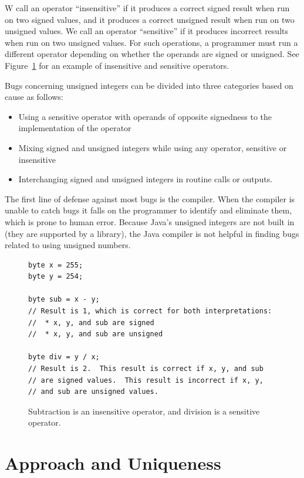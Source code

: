\documentclass{sig-alternate-05-2015}
\begin{document}
W call an operator ``insensitive'' if it produces a correct signed result
when run on two signed values, and it produces a correct unsigned result
when run on two unsigned values.  We call an operator ``sensitive'' if it
produces incorrect results when run on two unsigned values.  For such
operations, a programmer must run a different operator depending on whether
the operands are signed or unsigned.  See Figure~\ref{fig:operators} for
an example of insensitive and sensitive operators.

Bugs concerning unsigned integers can be divided into three categories based on cause as follows:

\begin{itemize}
  \item Using a sensitive operator with operands of opposite signedness to the implementation of the operator
  \item Mixing signed and unsigned integers while using any operator, sensitive or insensitive
  \item Interchanging signed and unsigned integers in routine calls or outputs.
\end{itemize}

The first line of defense against most bugs is the compiler. When the
compiler is unable to catch bugs it falls on the programmer to identify and
eliminate them, which is prone to human error. Because Java's unsigned
integers are not built in (they are supported by a library), the Java
compiler is not helpful in finding bugs related to using unsigned
numbers.

\begin{figure}
\smaller
\begin{lstlisting}
byte x = 255;
byte y = 254;

byte sub = x - y;
// Result is 1, which is correct for both interpretations:
//  * x, y, and sub are signed
//  * x, y, and sub are unsigned

byte div = y / x;
// Result is 2.  This result is correct if x, y, and sub
// are signed values.  This result is incorrect if x, y,
// and sub are unsigned values.
\end{lstlisting}
\caption{Subtraction is an insensitive operator, and
  division is a sensitive operator.}
\label{fig:operators}
\end{figure}


\section{Approach and Uniqueness}
\end{document}
